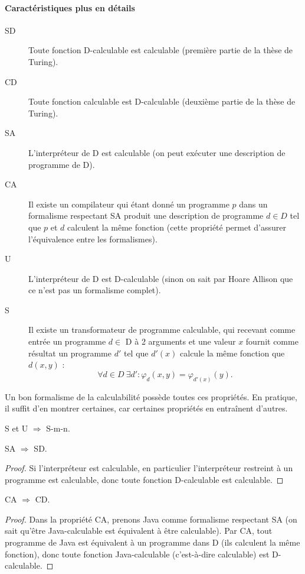\begin{description}
\paragraph{Caractéristiques plus en détails}
\begin{description}
	\item[SD]  Toute fonction D-calculable est calculable (première partie de la thèse de Turing).
	\item[CD]  Toute fonction calculable est D-calculable (deuxième partie de la thèse de Turing).
	\item[SA]  L'interpréteur de D est calculable (on peut exécuter une description de programme de D).
	\item[CA]  Il existe un compilateur qui étant donné un programme $p$ dans un formalisme respectant SA produit une description de programme $d \in D$ tel que $p$ et $d$ calculent la même fonction (cette propriété permet d'assurer l'équivalence entre les formalismes).
	\item[U]  L'interpréteur de D est D-calculable (sinon on sait par Hoare Allison que ce n'est pas un formalisme complet).
	\item[S] Il existe un transformateur de programme calculable, qui recevant comme entrée un programme $d \in$ D à 2 arguments et une valeur $x$ fournit comme résultat un programme $d'$ tel que $d'(x)$ calcule la même fonction que $d(x,y)$ :
$$\forall d\in D\ \exists d'\colon \varphi_d(x,y)=\varphi_{d'(x)}(y).$$
\end{description}
Un bon formalisme de la calculabilité possède toutes ces propriétés. En pratique, il suffit d'en montrer certaines, car certaines propriétés en entraînent d'autres.

\begin{myprop}
S et U $\Rightarrow$ S-m-n.
\end{myprop}

\begin{myprop}
SA $\Rightarrow$ SD.
    
\begin{proof}
Si l'interpréteur est calculable, en particulier l'interpréteur restreint à un programme est calculable, donc toute fonction D-calculable est calculable.
\end{proof}
\end{myprop}

\begin{myprop}
CA $\Rightarrow$ CD.
    
\begin{proof}
Dans la propriété CA, prenons Java comme formalisme respectant SA (on sait qu'être Java-calculable est équivalent à être calculable). Par CA, tout programme de Java est équivalent à un programme dans D (ils calculent la même fonction), donc toute fonction Java-calculable (c'est-à-dire calculable) est D-calculable.
\end{proof}
\end{myprop}


\end{description}
